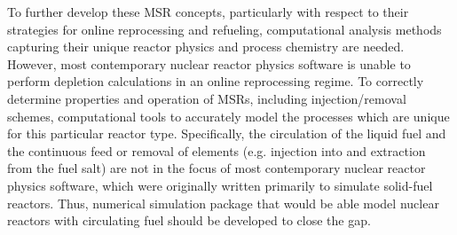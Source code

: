 To further develop these \gls{MSR} concepts, particularly with respect to their  
strategies for online reprocessing and refueling, computational analysis methods capturing their unique reactor physics and process chemistry are needed.
However, most contemporary nuclear reactor physics software is unable to 
perform depletion calculations in an online reprocessing regime. To correctly 
determine properties and operation of \glspl{MSR}, including injection/removal 
schemes, computational tools to accurately model the processes which are unique 
for this particular reactor type. Specifically, the circulation of the
liquid fuel and the continuous feed or removal of elements (e.g. injection into 
and extraction from the fuel salt) are not in the focus of most contemporary 
nuclear reactor physics software, which were originally written primarily to 
simulate solid-fuel reactors. Thus, numerical simulation package that would be 
able model nuclear reactors with circulating fuel should be developed to close 
the gap.

